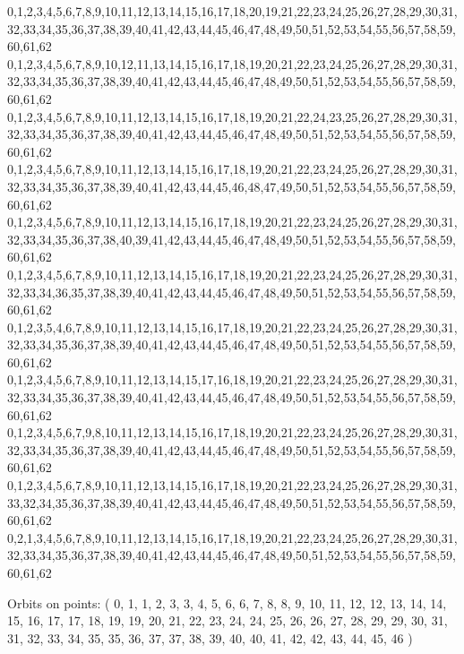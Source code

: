 \documentclass[12pt]{article}
\begin{document}
{0,1,2,3,4,5,6,7,8,9,10,11,12,13,14,15,16,17,18,20,19,21,22,23,24,25,26,27,28,29,30,31,32,33,34,35,36,37,38,39,40,41,42,43,44,45,46,47,48,49,50,51,52,53,54,55,56,57,58,59,60,61,62\\
0,1,2,3,4,5,6,7,8,9,10,12,11,13,14,15,16,17,18,19,20,21,22,23,24,25,26,27,28,29,30,31,32,33,34,35,36,37,38,39,40,41,42,43,44,45,46,47,48,49,50,51,52,53,54,55,56,57,58,59,60,61,62\\
0,1,2,3,4,5,6,7,8,9,10,11,12,13,14,15,16,17,18,19,20,21,22,24,23,25,26,27,28,29,30,31,32,33,34,35,36,37,38,39,40,41,42,43,44,45,46,47,48,49,50,51,52,53,54,55,56,57,58,59,60,61,62\\
0,1,2,3,4,5,6,7,8,9,10,11,12,13,14,15,16,17,18,19,20,21,22,23,24,25,26,27,28,29,30,31,32,33,34,35,36,37,38,39,40,41,42,43,44,45,46,48,47,49,50,51,52,53,54,55,56,57,58,59,60,61,62\\
0,1,2,3,4,5,6,7,8,9,10,11,12,13,14,15,16,17,18,19,20,21,22,23,24,25,26,27,28,29,30,31,32,33,34,35,36,37,38,40,39,41,42,43,44,45,46,47,48,49,50,51,52,53,54,55,56,57,58,59,60,61,62\\
0,1,2,3,4,5,6,7,8,9,10,11,12,13,14,15,16,17,18,19,20,21,22,23,24,25,26,27,28,29,30,31,32,33,34,36,35,37,38,39,40,41,42,43,44,45,46,47,48,49,50,51,52,53,54,55,56,57,58,59,60,61,62\\
0,1,2,3,5,4,6,7,8,9,10,11,12,13,14,15,16,17,18,19,20,21,22,23,24,25,26,27,28,29,30,31,32,33,34,35,36,37,38,39,40,41,42,43,44,45,46,47,48,49,50,51,52,53,54,55,56,57,58,59,60,61,62\\
0,1,2,3,4,5,6,7,8,9,10,11,12,13,14,15,17,16,18,19,20,21,22,23,24,25,26,27,28,29,30,31,32,33,34,35,36,37,38,39,40,41,42,43,44,45,46,47,48,49,50,51,52,53,54,55,56,57,58,59,60,61,62\\
0,1,2,3,4,5,6,7,9,8,10,11,12,13,14,15,16,17,18,19,20,21,22,23,24,25,26,27,28,29,30,31,32,33,34,35,36,37,38,39,40,41,42,43,44,45,46,47,48,49,50,51,52,53,54,55,56,57,58,59,60,61,62\\
0,1,2,3,4,5,6,7,8,9,10,11,12,13,14,15,16,17,18,19,20,21,22,23,24,25,26,27,28,29,30,31,33,32,34,35,36,37,38,39,40,41,42,43,44,45,46,47,48,49,50,51,52,53,54,55,56,57,58,59,60,61,62\\
0,2,1,3,4,5,6,7,8,9,10,11,12,13,14,15,16,17,18,19,20,21,22,23,24,25,26,27,28,29,30,31,32,33,34,35,36,37,38,39,40,41,42,43,44,45,46,47,48,49,50,51,52,53,54,55,56,57,58,59,60,61,62\\

\bigskip

Orbits on points: ( 0, 1, 1, 2, 3, 3, 4, 5, 6, 6, 7, 8, 8, 9, 10, 11, 12, 12, 13, 14, 14, 15, 16, 17, 17, 18, 19, 19, 20, 21, 22, 23, 24, 24, 25, 26, 26, 27, 28, 29, 29, 30, 31, 31, 32, 33, 34, 35, 35, 36, 37, 37, 38, 39, 40, 40, 41, 42, 42, 43, 44, 45, 46 )\\


}
\end{document}
